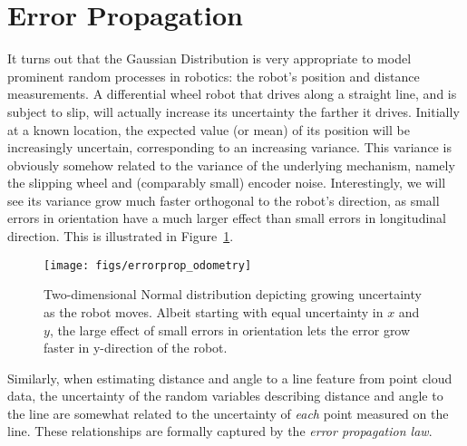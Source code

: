 \section{Error Propagation}\label{sec:errorprop}
It turns out that the Gaussian Distribution is very appropriate to model prominent random processes in robotics: the robot's position and distance measurements. A differential wheel robot that drives along a straight line, and is subject to slip, will actually increase its uncertainty the farther it drives. Initially at a known location, the expected value (or mean) of its position will be increasingly uncertain, corresponding to an increasing variance. This variance is obviously somehow related to the variance of the underlying mechanism, namely the slipping wheel and (comparably small) encoder noise. Interestingly, we will see its variance grow much faster orthogonal to the robot's direction, as small errors in orientation have a much larger effect than small errors in longitudinal direction. This is illustrated in Figure~\ref{fig:errorprop_odometry}.

\begin{figure}
	\centering
		\texttt{[image: figs/errorprop\_odometry]}
	\caption{Two-dimensional Normal distribution depicting growing uncertainty as the robot moves. Albeit starting with equal uncertainty in $x$ and $y$, the large effect of small errors in orientation lets the error grow faster in y-direction of the robot.}
	\label{fig:errorprop_odometry}
\end{figure}

Similarly, when estimating distance and angle to a line feature from point cloud data, the uncertainty of the random variables describing distance and angle to the line are somewhat related to the uncertainty of \emph{each} point measured on the line. These relationships are formally captured by the \emph{error propagation law}.

